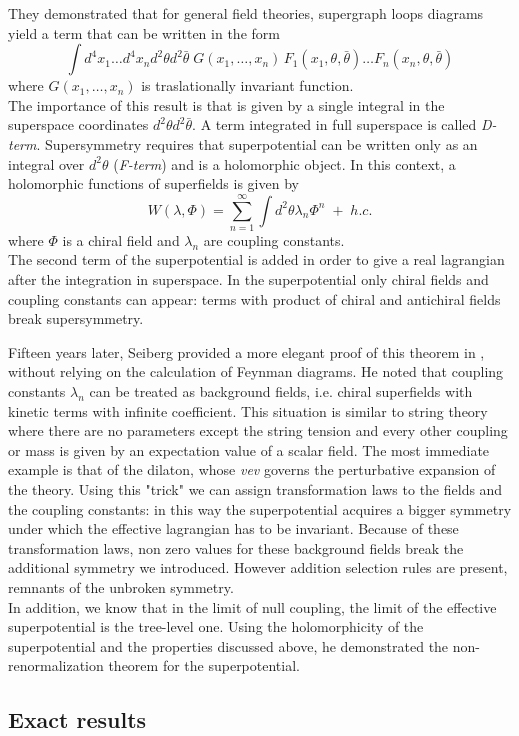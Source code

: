 They demonstrated that for general field theories, supergraph loops diagrams yield a term that can be written in the form
\begin{equation}
\int  d^4 x_1 \dots d^4 x_n d^2 \theta d^2 \bar{\theta} \; G (x_1 , \dots , x_n) \,F_1 ( x_1, \theta, \bar{\theta}) \dots  F_n ( x_n, \theta, \bar{\theta}) 
\end{equation} 
where $G (x_1 , \dots , x_n) $ is traslationally invariant function.\\
The importance of this result is that is given by a single integral in the superspace coordinates $d^2 \theta d^2 \bar{\theta }$.
A term integrated in full superspace is called \emph{D-term}.
Supersymmetry requires that superpotential can be written only as an integral over $d^2 \theta $ (\emph{F-term}) and is a holomorphic object.
In this context, a holomorphic functions of superfields is given by
\begin{equation}
 W (\lambda, \Phi) = \sum_{n=1}^{\infty}  \int d^2 \theta \lambda_n \Phi^n  \; +\; h.c. 
 \end{equation} 
 where $\Phi$ is a chiral field and $\lambda_n$ are coupling constants.\\
 The second term of the superpotential is added in order to give a real lagrangian after the integration in superspace.
 In the superpotential only chiral fields and coupling constants can appear: terms with product of chiral and antichiral fields break supersymmetry.


Fifteen years later, Seiberg provided a more elegant proof of this theorem in \cite{Seiberg:1993vc}, without relying on the calculation of Feynman diagrams.
He noted that coupling constants $\lambda_n$ can be treated as background fields, i.e. chiral superfields with kinetic terms with infinite coefficient.
This situation is similar to string theory where there are no parameters except the string tension and every other coupling or mass is given by an expectation value of a scalar field. 
The most immediate example is that of the dilaton, whose \emph{vev} governs the perturbative expansion of the theory.
Using this "trick" we can assign transformation laws to the fields and the coupling constants: in this way the superpotential acquires a bigger symmetry under which the effective lagrangian has to be invariant. 
Because of these transformation laws, non zero values for these background fields break the additional symmetry we introduced.
However addition selection rules are present, remnants of the unbroken symmetry.\\
In addition, we know that in the limit of null coupling, the limit of the effective superpotential is the tree-level one. 
Using the holomorphicity of the superpotential and the properties discussed above, he demonstrated the non-renormalization theorem for the superpotential. 



\subsection{Exact results}
